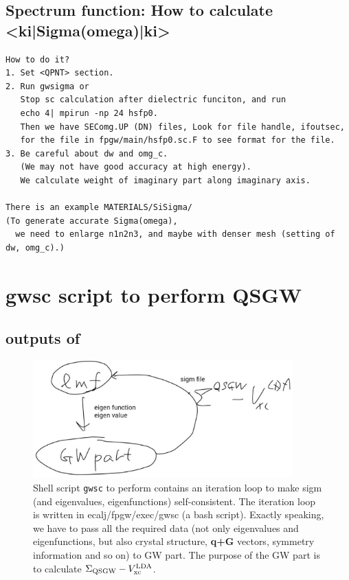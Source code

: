 
\subsection{Spectrum function: How to calculate <ki|Sigma(omega)|ki>}
\begin{verbatim}
How to do it?
1. Set <QPNT> section.
2. Run gwsigma or 
   Stop sc calculation after dielectric funciton, and run 
   echo 4| mpirun -np 24 hsfp0.
   Then we have SEComg.UP (DN) files, Look for file handle, ifoutsec,
   for the file in fpgw/main/hsfp0.sc.F to see format for the file.
3. Be careful about dw and omg_c.
   (We may not have good accuracy at high energy).
   We calculate weight of imaginary part along imaginary axis.

There is an example MATERIALS/SiSigma/
(To generate accurate Sigma(omega),
  we need to enlarge n1n2n3, and maybe with denser mesh (setting of dw, omg_c).)

\end{verbatim}

\newpage
\section{gwsc script to perform QSGW}
\label{gwsc}

\subsection{outputs of }

\begin{figure}[h]
\includegraphics[width=10cm]{gwsc2014-12-091.eps}
\caption[]{Shell script {\tt gwsc} to perform \QSGW contains 
an iteration loop to make sigm (and eigenvalues, eigenfunctions)
self-consistent. The iteration loop is written in 
ecalj/fpgw/exec/gwsc (a bash script). 
Exactly speaking, we have to pass all the required data 
(not only eigenvalues and eigenfunctions, but also 
crystal structure, {\bf q+G} vectors, symmetry information and so on) to GW part.
The purpose of the GW part is to calculate $\Sigma_{\rm QSGW}-V_{\rm xc}^{\rm LDA}$.}
\label{gwscpicture}
\end{figure}

